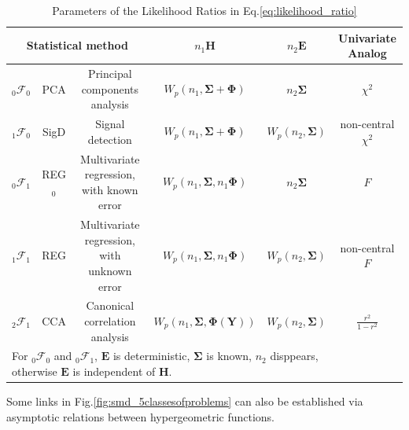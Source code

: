 \documentclass[twoside]{article}
\begin{document}
\begin{table}[ht]
    \caption{Parameters of the Likelihood Ratios in Eq.\ref{eq:likelihood_ratio}}\label{tab:6cases_parameters}
    \footnotesize
    \begin{center}
      \begin{tabular}{lccccc}
        
        \multicolumn{3}{c}{Statistical method} & $n_1\mathbf{H}$ & $n_2\mathbf{E}$ & Univariate Analog \\
        \hline
        $_{\mathrm{0}}\mathcal{F}_{\mathrm{0}}$ & PCA & Principal components analysis & $W_p(n_1,\boldsymbol{\Sigma+\Phi})$ & $n_2\boldsymbol{\Sigma}$ & $\chi^2$\\
        $_{\mathrm{1}}\mathcal{F}_{\mathrm{0}}$ & SigD & Signal detection & $W_p(n_1,\boldsymbol{\Sigma+\Phi})$ & $W_p(n_2,\boldsymbol{\Sigma})$ & non-central $\chi^2$ \\
        $_{\mathrm{0}}\mathcal{F}_{\mathrm{1}}$ & REG$_0$ & Multivariate regression, with known error & $W_p(n_1,\boldsymbol{\Sigma},n_1\boldsymbol{\Phi})$ & $n_2\boldsymbol{\Sigma}$ & $F$ \\
        $_{\mathrm{1}}\mathcal{F}_{\mathrm{1}}$ & REG & Multivariate regression, with unknown error & $W_p(n_1,\boldsymbol{\Sigma},n_1\boldsymbol{\Phi})$ & $W_p(n_2,\boldsymbol{\Sigma})$ & non-central $F$ \\
        $_{\mathrm{2}}\mathcal{F}_{\mathrm{1}}$ & CCA & Canonical correlation analysis & $W_p(n_1,\boldsymbol{\Sigma},\boldsymbol{\Phi}(\mathbf{Y}))$ & $W_p(n_2,\boldsymbol{\Sigma})$ & $\frac{r^2}{1-r^2}$\\ \hline
        \multicolumn{5}{l}{For $_{\mathrm{0}}\mathcal{F}_{\mathrm{0}}$ and $_{\mathrm{0}}\mathcal{F}_{\mathrm{1}}$, $\mathbf{E}$ is deterministic, $\boldsymbol{\Sigma}$ is known, $n_2$ disppears, otherwise $\mathbf{E}$ is independent of $\mathbf{H}$.}
      \end{tabular}
    \end{center}
\end{table}

Some links in Fig.\ref{fig:smd_5classesofproblems} can also be established via asymptotic relations between hypergeometric functions.

\newpage


\end{document}
